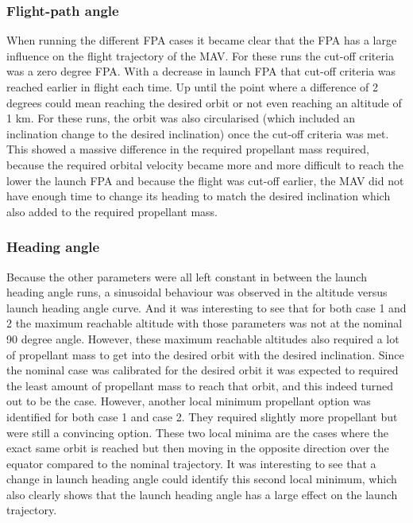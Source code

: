\subsubsection{Flight-path angle}
When running the different \ac{FPA} cases it became clear that the \ac{FPA} has a large influence on the flight trajectory of the \ac{MAV}. For these runs the cut-off criteria was a zero degree \ac{FPA}. With a decrease in launch \ac{FPA} that cut-off criteria was reached earlier in flight each time. Up until the point where a difference of 2 degrees could mean reaching the desired orbit or not even reaching an altitude of 1 km. For these runs, the orbit was also circularised (which included an inclination change to the desired inclination) once the cut-off criteria was met. This showed a massive difference in the required propellant mass required, because the required orbital velocity became more and more difficult to reach the lower the launch \ac{FPA} and because the flight was cut-off earlier, the \ac{MAV} did not have enough time to change its heading to match the desired inclination which also added to the required propellant mass.

\subsubsection{Heading angle}
Because the other parameters were all left constant in between the launch heading angle runs, a sinusoidal behaviour was observed in the altitude versus launch heading angle curve. And it was interesting to see that for both case 1 and 2 the maximum reachable altitude with those parameters was not at the nominal 90 degree angle. However, these maximum reachable altitudes also required a lot of propellant mass to get into the desired orbit with the desired inclination. Since the nominal case was calibrated for the desired orbit it was expected to required the least amount of propellant mass to reach that orbit, and this indeed turned out to be the case. However, another local minimum propellant option was identified for both case 1 and case 2. They required slightly more propellant but were still a convincing option. These two local minima are the cases where the exact same orbit is reached but then moving in the opposite direction over the equator compared to the nominal trajectory. It was interesting to see that a change in launch heading angle could identify this second local minimum, which also clearly shows that the launch heading angle has a large effect on the launch trajectory.


